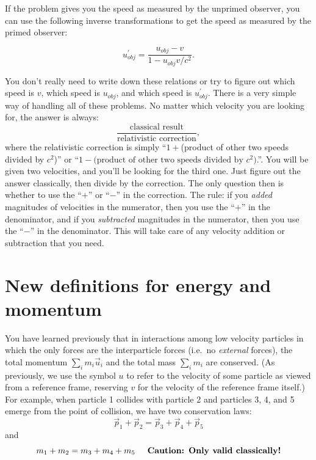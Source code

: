 If the problem gives you the speed as measured by the unprimed observer, 
you can use the following inverse transformations to get the speed as
measured by the primed observer:

\begin{lemma}
\begin{equation}
u_{ obj}^\prime = \frac{u_{ obj}- v}{1 - u_{ obj} v/c^2}.
\label{eq:vtransform-inverse}
\end{equation}
\end{lemma} 

You don't really need to write down these relations or try to figure
out which speed is $v$, which speed is $u_{ obj}$, and which speed
is $u_{ obj}^\prime$.  There is a very simple way of handling all
of these problems.  No matter which velocity you are looking for, the
answer is always:
\begin{equation}
\frac{\text{classical result}}{\text{relativistic correction}},  
\end{equation}
where the relativistic correction is simply ``$1+$(product of other two
speeds divided by $c^2$)'' or ``$1-\text{(product of other two speeds 
divided by $c^2$)}$.''.  You will be given two velocities, and you'll 
be looking for the third one.  Just figure out the answer classically, 
then divide by the correction.  The only question then is whether to use 
the ``$+$'' or ``$-$'' in the correction.  The rule: if you \emph{added} 
magnitudes of
velocities in the numerator, then you use the ``$+$'' in the denominator,
and if you \emph{subtracted} magnitudes in the numerator, then you use the
``$-$'' in the denominator.  This will take care of any velocity addition
or subtraction that you need.

\section{New definitions for energy and momentum}

You have learned previously that in interactions among low velocity
particles in which the only forces are the interparticle forces
(i.e.\ no \emph{external} forces), the total momentum $\sum_i
m_i\vec{u}_i$ and the total mass $\sum_i m_i$ are conserved.  (As 
previously, we use the symbol $u$ to
refer to the velocity of some particle as viewed from a reference
frame, reserving $v$ for the velocity of the reference frame itself.)
For example, when particle 1 collides with particle 2 and particles 3,
4, and 5 emerge from the point of collision, we have two conservation
laws:
\begin{equation}
\vec{p}_1 +\vec{p}_2 = \vec{p}_3 +\vec{p}_4 +\vec{p}_5
\label{eq:pcons}
\end{equation}
and
\begin{equation}
m_1 + m_2 = m_3 + m_4 + m_5 
   \text{\hspace{0.2in}\textbf{Caution: Only valid classically!}}
\label{eq:mcons}
\end{equation}

